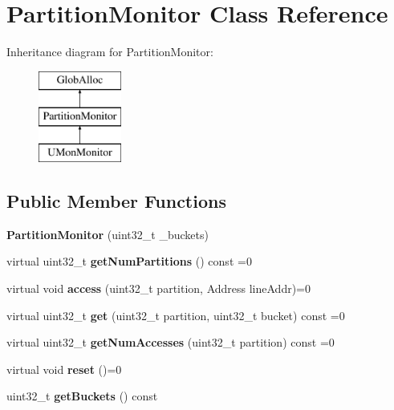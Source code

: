 \hypertarget{classPartitionMonitor}{\section{Partition\-Monitor Class Reference}
\label{classPartitionMonitor}
}
Inheritance diagram for Partition\-Monitor\-:\begin{figure}[H]
\begin{center}
\leavevmode
\includegraphics[height=3.000000cm]{classPartitionMonitor}
\end{center}
\end{figure}
\subsection*{Public Member Functions}
\begin{DoxyCompactItemize}
\item 
\hypertarget{classPartitionMonitor_ae73b922c20ccfebc1f033771143f81e3}{{\bfseries Partition\-Monitor} (uint32\-\_\-t \-\_\-buckets)}\label{classPartitionMonitor_ae73b922c20ccfebc1f033771143f81e3}

\item 
\hypertarget{classPartitionMonitor_ad8d8b89fc2e2f43448bcdacfbdd18dbc}{virtual uint32\-\_\-t {\bfseries get\-Num\-Partitions} () const =0}\label{classPartitionMonitor_ad8d8b89fc2e2f43448bcdacfbdd18dbc}

\item 
\hypertarget{classPartitionMonitor_ad8069e2e85d1258e0048cd3063897a43}{virtual void {\bfseries access} (uint32\-\_\-t partition, Address line\-Addr)=0}\label{classPartitionMonitor_ad8069e2e85d1258e0048cd3063897a43}

\item 
\hypertarget{classPartitionMonitor_a56745f29286e5ac23ce377d71b959226}{virtual uint32\-\_\-t {\bfseries get} (uint32\-\_\-t partition, uint32\-\_\-t bucket) const =0}\label{classPartitionMonitor_a56745f29286e5ac23ce377d71b959226}

\item 
\hypertarget{classPartitionMonitor_a0fc28e3e100251f131f5232c405d0495}{virtual uint32\-\_\-t {\bfseries get\-Num\-Accesses} (uint32\-\_\-t partition) const =0}\label{classPartitionMonitor_a0fc28e3e100251f131f5232c405d0495}

\item 
\hypertarget{classPartitionMonitor_ab12bee1a4397eb8ddf621e3bf58edea1}{virtual void {\bfseries reset} ()=0}\label{classPartitionMonitor_ab12bee1a4397eb8ddf621e3bf58edea1}

\item 
\hypertarget{classPartitionMonitor_a328f7bd7b831a8834e559d87bf554d92}{uint32\-\_\-t {\bfseries get\-Buckets} () const }\label{classPartitionMonitor_a328f7bd7b831a8834e559d87bf554d92}

\end{DoxyCompactItemize}
